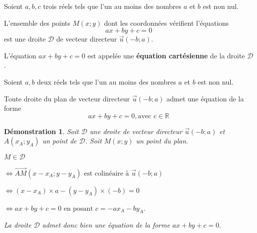 \documentclass[a4paper,11pt]{article}
\theoremstyle{break}
\newcounter{enonce}
\newtheorem{demonstration}[enonce]{Démonstration}
\begin{document}
   \begin{theorem}

    Soient $a,b,c$ trois réels tels que l'un au moins des nombres $a$ et $b$ est non nul.
    
    L'ensemble des points $M(x;y)$ dont les coordonnées vérifient l'équations
    $$ax+by+c=0$$ est une droite $\mathcal{D}$ de vecteur directeur $\vec{u}{(-b;a)}$.
    
    L'équation $ax+by+c=0$ est appelée une \textbf{équation cartésienne} de la droite $\mathcal{D}$.
   
   \end{theorem}
   
   \newpage
   
     \begin{theorem}

    Soient $a,b$ deux réels tels que l'un au moins des nombres $a$ et $b$ est non nul.
    
    Toute droite du plan de vecteur directeur $\vec{u}(-b;a)$ admet une équation de la forme 
    $$ax+by+c=0, \textrm{avec $c \in \mathbb{R}$}$$
   
   \end{theorem}
   
   \begin{demonstration}
    
    Soit $\mathcal{D}$ une droite de vecteur directeur $\vec{u}(-b;a)$ et $A(x_A;y_A)$ un point de 
    $\mathcal{D}$. Soit $M(x;y)$ un point du plan.
    
    $M \in \mathcal{D}$
    
    $\iff {\vec{AM}}({x-x_A};{y-y_A}) 
    \textrm{ est colinéaire à } {\vec{u}(-b;a)}$
    
    $\iff (x-x_A)\times {a} -{(y-y_A)} \times (-b)=0$ 
    
    $\iff ax+by+c=0 \textrm{ en posant }c={-ax_A-by_A}$.
    
    La droite $\mathcal{D}$ admet donc bien une équation de la forme $ax+by+c=0$.
   \end{demonstration}
   
\end{document}
